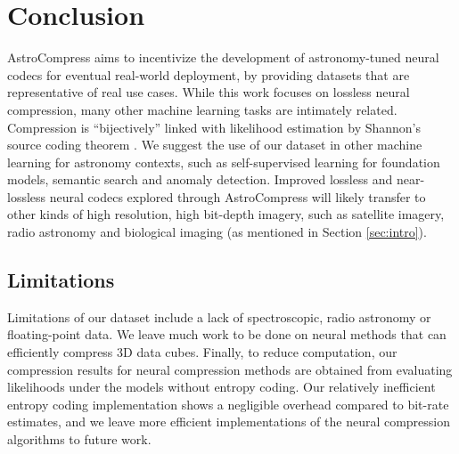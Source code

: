 \section{Conclusion}
\label{sec:conclusion}



AstroCompress aims to incentivize the development of astronomy-tuned neural codecs for eventual real-world deployment, by providing datasets that are representative of real use cases. While this work focuses on lossless neural compression, many other machine learning tasks are intimately related. Compression is ``bijectively'' linked with likelihood estimation by Shannon's source coding theorem \citep{shannon1948mathematical}. We suggest the use of our dataset in other machine learning for astronomy contexts, such as self-supervised learning for foundation models, semantic search and anomaly detection. Improved lossless and near-lossless neural codecs explored through AstroCompress will likely transfer to other kinds of high resolution, high bit-depth imagery, such as satellite imagery, radio astronomy and biological imaging (as mentioned in Section \ref{sec:intro}).



\subsection{Limitations}

Limitations of our dataset include a lack of spectroscopic, radio astronomy or floating-point data. We leave much work to be done on neural methods that can efficiently compress 3D data cubes. Finally, to reduce computation, our compression results for neural compression methods are obtained from evaluating likelihoods under the models without entropy coding. Our relatively inefficient entropy coding implementation shows a negligible overhead compared to bit-rate estimates, and we leave  more efficient implementations of the neural compression algorithms to future work.



